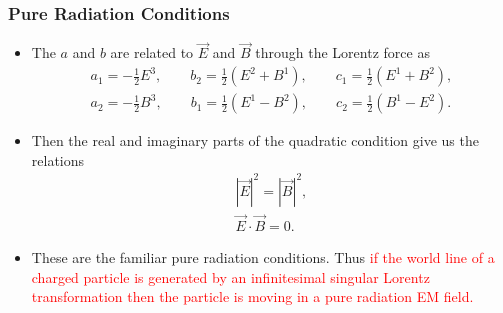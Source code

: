 \documentclass[10pt,a4paper]{beamer}
\begin{document}
\begin{frame} 
\frametitle{Pure Radiation Conditions}
\begin{itemize}
\item<1->{The $a$ and $b$ are related to $\vec{E}$ and $\vec{B}$ through the Lorentz force as
\begin{eqnarray*}
a_1 = -\frac{1}{2} E^3, \qquad b_2 = \frac{1}{2}(E^2 + B^1), \qquad c_1 = \frac{1}{2} (E^1 + B^2),\\
a_2 = -\frac{1}{2} B^3, \qquad b_1 = \frac{1}{2} (E^1 - B^2), \qquad c_2  = \frac{1}{2} (B^1 - E^2). 
\end{eqnarray*}}
\item<2->{Then the real and imaginary parts of the quadratic condition give us the relations
\begin{gather*}
{|\vec{E}|}^2 = {|\vec{B}|}^2, \\
\vec{E} \cdot \vec{B} = 0.
\end{gather*}}
\item<3->{These are the familiar pure radiation conditions. Thus \textcolor{red}{if the world line of a charged particle is generated by an infinitesimal singular Lorentz transformation then the particle is moving in a pure radiation EM field.}}
\end{itemize}

\end{frame}

%

%
%
\end{document}
